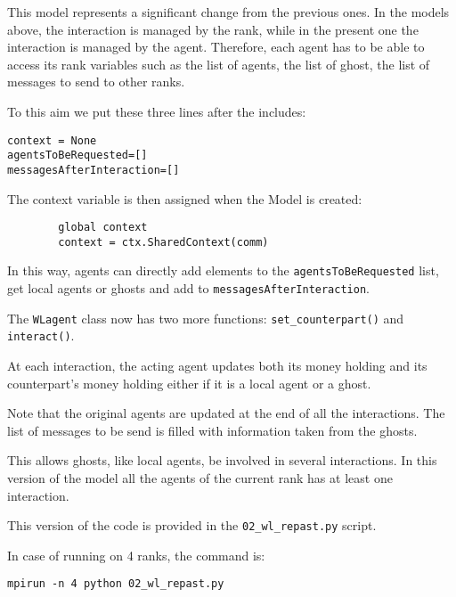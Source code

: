 \documentclass{article}
\begin{document}
This model represents a significant change from the previous ones. In the models above, the interaction is managed by the rank, while in the present one the interaction is managed by the agent.  
Therefore, each agent has to be able to access its rank variables such as the list of agents, the list of ghost, the list of messages to send to other ranks. 

To this aim we put these three lines after the includes:
\begin{verbatim}
context = None
agentsToBeRequested=[]
messagesAfterInteraction=[]
\end{verbatim}
The context variable is then assigned when the Model is created:
\begin{verbatim}
        global context
        context = ctx.SharedContext(comm)
\end{verbatim}
In this way, agents can directly add elements to the \verb+agentsToBeRequested+ list, get local agents or ghosts and add to \verb+messagesAfterInteraction+.

The \verb+WLagent+ class now has two more functions: \verb+set_counterpart()+ and \verb+interact()+. 

At each interaction, the acting agent updates both its money holding and its counterpart's money holding either if it is a local agent or a ghost.

Note that the original agents are updated at the end of all the interactions. The list of messages to be send is filled with information taken from the ghosts.

This allows ghosts, like local agents, be involved in several interactions. In this version of the model all the agents of the current rank has at least one interaction.

This version of the code is provided in the \verb+02_wl_repast.py+ script.

In case of running on 4 ranks, the command is:
\begin{verbatim}
mpirun -n 4 python 02_wl_repast.py
\end{verbatim}
\end{document}
